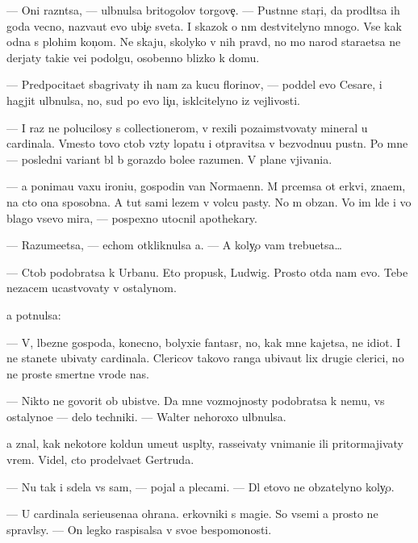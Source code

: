 \documentclass[10pt]{book}
\begin{document}
— Oni razn{\ia}tsa, — ul{\yi}bnulsa britogolov{\yi}{\y} torgove{\c}. — Pust{\yi}nn{\yi}{\y}e star{\c}i, da prodl{\ia}tsa ih goda vecno, naz{\yi}va{\y}ut {\y}evo ubi{\y}{\c}e{\y} sveta. I skazok o n{\e}m de{\y}stvitelyno mnogo. Vse kak odna s plohim kon{\c}om. Ne skaju, skolyko v nih pravd{\yi}, no mo{\y} narod stara{\y}etsa ne derjaty taki{\y}e ve{\x}i podolgu, osobenno blizko k domu.

— Predpocita{\y}et sbagrivaty ih nam za kucu florinov, — poddel {\y}evo Cesare, i hagjit ul{\yi}bnulsa, no, sud{\ia} po {\y}evo li{\c}u, iskl{\io}citelyno iz vejlivosti.

— I raz ne polucilosy s collectionerom, v{\yi} rexili poza{\y}imstvovaty mineral u cardinala. Vmesto tovo ctob{\yi} vz{\ia}ty lopatu i otpravitsa v bezvodnu{\y}u pust{\yi}n{\io}. Po mne — posledni{\y} variant b{\yi}l b{\yi} gorazdo bole{\y}e razumen. V plane v{\yi}jivani{\y}a.

— {\Y}a ponima{\y}u vaxu ironi{\y}u, gospodin van Normaenn. M{\yi} pr{\ia}cemsa ot {\C}erkvi, zna{\y}em, na cto ona sposobna. A tut sami lezem v volc{\y}u pasty. No m{\yi} ob{\ia}zan{\yi}. Vo im{\ia} l{\io}de{\y} i vo blago vsevo mira, — pospexno utocnil apothekary.

— Razume{\y}etsa, — echom otkliknulsa {\y}a. — A koly{\c}o vam trebu{\y}etsa…

— Ctob{\yi} podobratsa k Urbanu. Eto propusk, Ludwig. Prosto otda{\y} nam {\y}evo. Tebe nezacem ucastvovaty v ostalynom.

{\Y}a pot{\ia}nulsa:

— V{\yi}, l{\io}bezn{\yi}{\y}e gospoda, konecno, bolyxi{\y}e fantas{\e}r{\yi}, no, kak mne kajetsa, ne idiot{\yi}. I ne stanete ubivaty cardinala. Clericov takovo ranga ubiva{\y}ut lix drugi{\y}e clerici, no ne prost{\yi}{\y}e smertn{\yi}{\y}e vrode nas.

— Nikto ne govorit ob ubi{\y}stve. Da{\y} mne vozmojnosty podobratsa k nemu, vs{\e} ostalyno{\y}e — delo techniki. — Walter nehoroxo ul{\yi}bnulsa.

{\Y}a znal, kak nekotor{\yi}{\y}e koldun{\yi} ume{\y}ut us{\yi}pl{\ia}ty, rasse{\y}ivaty vnimani{\y}e ili pritormajivaty vrem{\ia}. Videl, cto prodel{\yi}va{\y}et Gertruda.

— Nu tak i sdela{\y} vs{\e} sam, — pojal {\y}a plecami. — Dl{\ia} etovo ne ob{\ia}zatelyno koly{\c}o.

— U cardinala serieusena{\y}a ohrana. {\C}erkovniki s magi{\y}e{\y}. So vsemi {\y}a prosto ne spravl{\io}sy. — On legko raspisalsa v svo{\y}e{\y} bespomo{\x}nosti.
\end{document}
